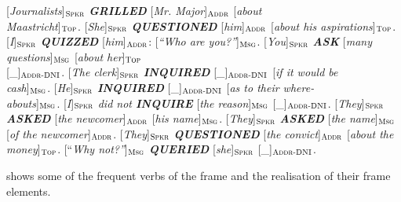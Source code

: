 \documentclass[output=paper,colorlinks,citecolor=brown]{langscibook}
\begin{document}
\begin{exe} 
\ex \label{ex07question}
\begin{xlist}
\ex \label{ex07question:a}
 {[}\textit{Journalists}{]}$_{\text{\textsc{Spkr}}}$ \textit{\textbf{GRILLED}} [\textit{Mr. Major}]$_{\text{\textsc{Addr}}}$ [\textit{about \\Maastricht}]$_{\text{\textsc{Top}}}$.
\ex  \label{ex07question:b}
{[}\textit{She}{]}$_{\text{\textsc{Spkr}}}$ \textit{\textbf{QUESTIONED}} [\textit{him}]$_{\text{\textsc{Addr}}}$ [\textit{about his aspirations}]$_{\text{\textsc{Top}}}$.
\ex  \label{ex07question:c}
{[}\textit{I}{]}$_{\text{\textsc{Spkr}}}$ \textit{\textbf{QUIZZED}} [\textit{him}]$_{\text{\textsc{Addr}}}$: [\textit{``Who are you?''}]$_{\text{\textsc{Msg}}}$.
\ex  \label{ex07question:d}
{[}\textit{You}{]}$_{\text{\textsc{Spkr}}}$ \textit{\textbf{ASK}} [\textit{many questions}]$_{\text{\textsc{Msg}}}$ [\textit{about her}]$_{\text{\textsc{Top}}}$ \\ {[\_]}$_{\text{\textsc{Addr-DNI}}}$.
\ex  \label{ex07question:e}
{[}\textit{The clerk}{]}$_{\text{\textsc{Spkr}}}$ \textit{\textbf{INQUIRED}} [\textit{\_}]$_{\text{\textsc{Addr-DNI}}}$ [\textit{if it would be \\cash}]$_{\text{\textsc{Msg}}}$.
\ex  \label{ex07question:f}
{[}\textit{He}{]}$_{\text{\textsc{Spkr}}}$ \textit{\textbf{INQUIRED}} [\_]$_{\text{\textsc{Addr-DNI}}}$ [\textit{as to their where-\\abouts}]$_{\text{\textsc{Msg}}}$.
\ex  \label{ex07question:g}
{[}\textit{I}{]}$_{\text{\textsc{Spkr}}}$ \textit{did not \textbf{INQUIRE}} [\textit{the reason}]$_{\text{\textsc{Msg}}}$ [\_]$_{\text{\textsc{Addr-DNI}}}$.
\ex  \label{ex07question:h}
{[}\textit{They}{]}$_{\text{\textsc{Spkr}}}$ \textit{\textbf{ASKED}} [\textit{the newcomer}]$_{\text{\textsc{Addr}}}$ [\textit{his name}]$_{\text{\textsc{Msg}}}$.
\ex  \label{ex07question:i}
{[}\textit{They}{]}$_{\text{\textsc{Spkr}}}$ \textit{\textbf{ASKED}} [\textit{the name}]$_{\text{\textsc{Msg}}}$ [\textit{of the newcomer}]$_{\text{\textsc{Addr}}}$.
\ex  \label{ex07question:j}
{[}\textit{They}{]}$_{\text{\textsc{Spkr}}}$ \textit{\textbf{QUESTIONED}} [\textit{the convict}]$_{\text{\textsc{Addr}}}$ [\textit{about the \\money}]$_{\text{\textsc{Top}}}$.
\ex  \label{ex07question:k}
{[}``\textit{Why not?''}{]}$_{\text{\textsc{Msg}}}$ \textit{\textbf{QUERIED}} [\textit{she}]$_{\text{\textsc{Spkr}}}$ {[\_]}$_{\text{\textsc{Addr-DNI}}}$.
\end{xlist}
\end{exe}

 shows some of the frequent verbs of the frame and the realisation of their frame elements.
\end{document}

